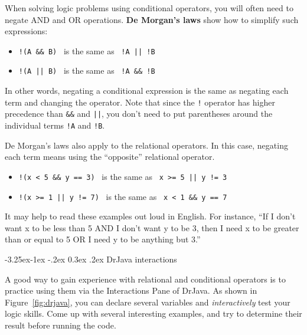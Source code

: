 \documentclass[12pt]{book}
\makeatletter
\renewcommand\subsection{\@startsection{subsection}{2}{\z@}%
    {-3.25ex\@plus -1ex \@minus -.2ex}%
    {0.3ex \@plus .2ex}%
    {\normalfont\large\bfseries}}
\theoremstyle{exercise}
\newcommand{\java}[1]{\lstinline{#1}} %
\makeatother
\begin{document}

When solving logic problems using conditional operators, you will often need to negate AND and OR operations.
{\bf De Morgan's laws} show how to simplify such expressions:

\begin{itemize}
\item \java{!(A && B)} ~is the same as~ \java{!A || !B}
\item \java{!(A || B)} ~is the same as~ \java{!A && !B}
\end{itemize}

In other words, negating a conditional expression is the same as negating each term and changing the operator.
Note that since the \java{!} operator has higher precedence than \java{&&} and \java{||}, you don't need to put parentheses around the individual terms \java{!A} and \java{!B}.

De Morgan's laws also apply to the relational operators.
In this case, negating each term means using the ``opposite'' relational operator.

\begin{itemize}
\item \java{!(x < 5 && y == 3)} ~is the same as~ \java{x >= 5 || y != 3}
\item \java{!(x >= 1 || y != 7)} ~is the same as~ \java{x < 1 && y == 7}
\end{itemize}

It may help to read these examples out loud in English.
For instance, ``If I don't want x to be less than 5 AND I don't want y to be 3, then I need x to be greater than or equal to 5 OR I need y to be anything but 3.''

\subsection{DrJava interactions}

A good way to gain experience with relational and conditional operators is to practice using them via the Interactions Pane of DrJava.
As shown in Figure~\ref{fig:drjava}, you can declare several variables and {\it interactively} test your logic skills.
Come up with several interesting examples, and try to determine their result before running the code.
\end{document}
